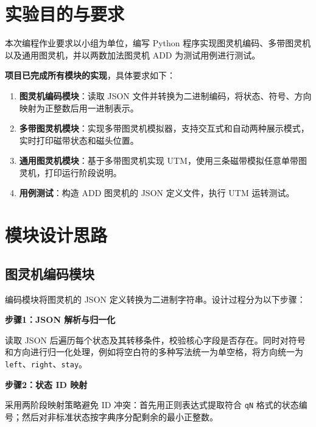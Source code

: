 \documentclass{sysucseexp}
\begin{document}
\makecover
\tableofcontents
\cleardoublepage
\pagestyle{main}


\section{实验目的与要求}

本次编程作业要求以小组为单位，编写 Python 程序实现图灵机编码、多带图灵机以及通用图灵机，并以两数加法图灵机 ADD 为测试用例进行测试。

\textbf{项目已完成所有模块的实现}，具体要求如下：

\begin{enumerate}
    \item \textbf{图灵机编码模块}：读取 JSON 文件并转换为二进制编码，将状态、符号、方向映射为正整数后用一进制表示。

    \item \textbf{多带图灵机模块}：实现多带图灵机模拟器，支持交互式和自动两种展示模式，实时打印磁带状态和磁头位置。

    \item \textbf{通用图灵机模块}：基于多带图灵机实现 UTM，使用三条磁带模拟任意单带图灵机，打印运行阶段说明。

    \item \textbf{用例测试}：构造 ADD 图灵机的 JSON 定义文件，执行 UTM 运转测试。
\end{enumerate}

\section{模块设计思路}

\subsection{图灵机编码模块}

编码模块将图灵机的 JSON 定义转换为二进制字符串。设计过程分为以下步骤：

\textbf{步骤1：JSON 解析与归一化}

读取 JSON 后遍历每个状态及其转移条件，校验核心字段是否存在。同时对符号和方向进行归一化处理，例如将空白符的多种写法统一为单空格，将方向统一为 \texttt{left}、\texttt{right}、\texttt{stay}。

\textbf{步骤2：状态 ID 映射}

采用两阶段映射策略避免 ID 冲突：首先用正则表达式提取符合 \texttt{qN} 格式的状态编号；然后对非标准状态按字典序分配剩余的最小正整数。
\end{document}
